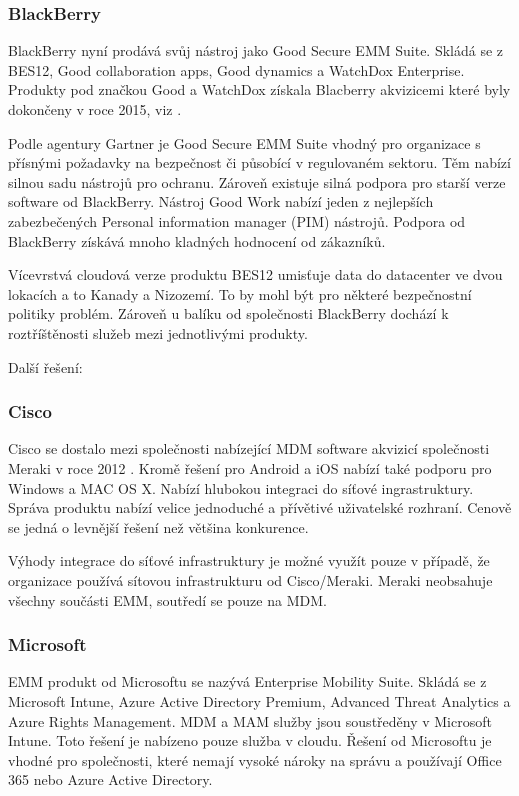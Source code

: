 \subsubsection{BlackBerry}
BlackBerry nyní prodává svůj nástroj jako Good Secure EMM Suite. Skládá se z BES12, Good collaboration apps, Good dynamics a WatchDox Enterprise. Produkty pod značkou Good a WatchDox získala Blacberry akvizicemi které byly dokončeny v roce 2015, viz \cite{BBBuyDox, BBBuyGood}.

Podle agentury Gartner je Good Secure EMM Suite vhodný pro organizace s přísnými požadavky na bezpečnost či působící v regulovaném sektoru. Těm nabízí silnou sadu nástrojů pro ochranu. Zároveň existuje silná podpora pro starší verze software od BlackBerry. Nástroj Good Work nabízí jeden z nejlepších zabezbečených Personal information manager (PIM) nástrojů. Podpora od BlackBerry získává mnoho kladných hodnocení od zákazníků. 

Vícevrstvá cloudová verze produktu BES12 umisťuje data do datacenter ve dvou lokacích a to Kanady a Nizozemí. To by mohl být pro některé bezpečnostní politiky problém. Zároveň u balíku od společnosti BlackBerry dochází k roztříštěnosti služeb mezi jednotlivými produkty.


Další řešení:

\subsubsection{Cisco}
Cisco se dostalo mezi společnosti nabízející MDM software akvizicí společnosti Meraki v roce 2012 \cite{CiscoBuyMeraki}. Kromě řešení pro Android a iOS nabízí také podporu pro Windows a MAC OS X. Nabízí hlubokou integraci do síťové ingrastruktury. Správa produktu nabízí velice jednoduché a přívětivé uživatelské rozhraní. Cenově se jedná o levnější řešení než většina konkurence.

Výhody integrace do síťové infrastruktury je možné využít pouze v případě, že organizace používá sítovou infrastrukturu od Cisco/Meraki. Meraki neobsahuje všechny součásti EMM, soutředí se pouze na MDM.



\subsubsection{Microsoft}
EMM produkt od Microsoftu se nazývá Enterprise Mobility Suite. Skládá se z Microsoft Intune, Azure Active Directory Premium, Advanced Threat Analytics a Azure Rights Management. MDM a MAM služby jsou soustředěny v Microsoft Intune. Toto řešení je nabízeno pouze služba v cloudu. Řešení od Microsoftu je vhodné pro společnosti, které nemají vysoké nároky na správu a používají Office 365 nebo Azure Active Directory.

